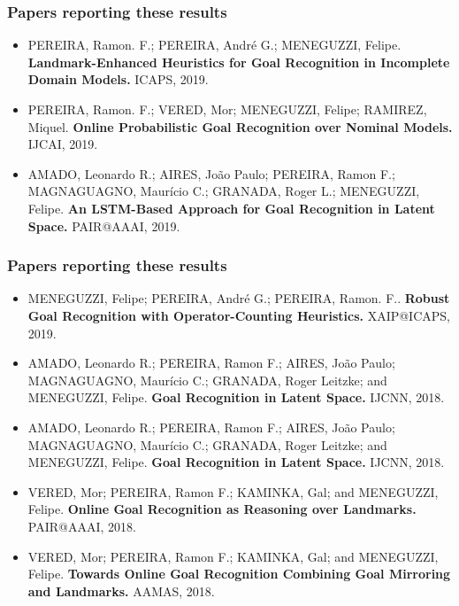 \documentclass[usenames,dvipsnames]{beamer}
\begin{document}
\begin{frame}[c]\frametitle{Papers reporting these results}
	\footnotesize
	\begin{itemize}
	\item[] PEREIRA, Ramon. F.; PEREIRA, André G.; MENEGUZZI, Felipe. \textbf{Landmark-Enhanced Heuristics for Goal Recognition in Incomplete Domain Models.} ICAPS, 2019. 
	\item[] PEREIRA, Ramon. F.; VERED, Mor; MENEGUZZI, Felipe; RAMIREZ, Miquel. \textbf{Online Probabilistic Goal Recognition over Nominal Models.} IJCAI, 2019. 
	\item[] AMADO, Leonardo R.; AIRES, João Paulo; PEREIRA, Ramon F.; MAGNAGUAGNO, Maurício C.; GRANADA, Roger L.; MENEGUZZI, Felipe. \textbf{An LSTM-Based Approach for Goal Recognition in Latent Space.} PAIR@AAAI, 2019. 
	\end{itemize}
\end{frame}

\begin{frame}[c]\frametitle{Papers reporting these results}
	\footnotesize
	\begin{itemize}
	\item[] MENEGUZZI, Felipe; PEREIRA, André G.; PEREIRA, Ramon. F.. \textbf{Robust Goal Recognition with Operator-Counting Heuristics.} XAIP@ICAPS, 2019.  
	\item[] AMADO, Leonardo R.; PEREIRA, Ramon F.; AIRES, João Paulo; MAGNAGUAGNO, Maurício C.; GRANADA, Roger Leitzke; and MENEGUZZI, Felipe. \textbf{Goal Recognition in Latent Space.} IJCNN, 2018.
	\item[] AMADO, Leonardo R.; PEREIRA, Ramon F.; AIRES, João Paulo; MAGNAGUAGNO, Maurício C.; GRANADA, Roger Leitzke; and MENEGUZZI, Felipe. \textbf{Goal Recognition in Latent Space.} IJCNN, 2018.
	\item[] VERED, Mor; PEREIRA, Ramon F.; KAMINKA, Gal; and MENEGUZZI, Felipe. \textbf{Online Goal Recognition as Reasoning over Landmarks.} PAIR@AAAI, 2018.
	\item[] VERED, Mor; PEREIRA, Ramon F.; KAMINKA, Gal; and MENEGUZZI, Felipe. \textbf{Towards Online Goal Recognition Combining Goal Mirroring and Landmarks.} AAMAS, 2018.
	\end{itemize}
\end{frame}
\end{document}
